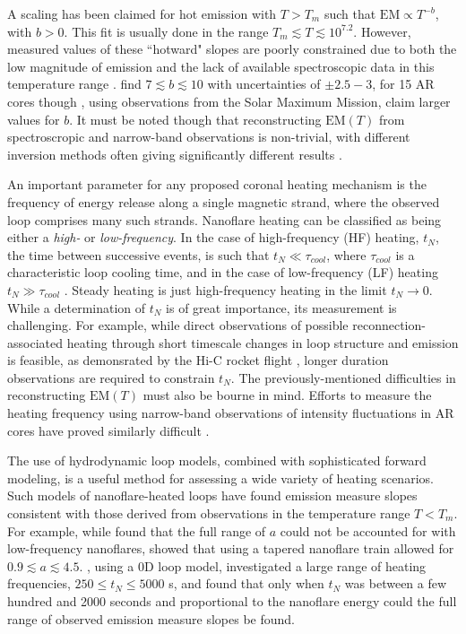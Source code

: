 \documentclass[preprint,linenumbers]{aastex}
\begin{document}
	\par A scaling has been claimed for hot emission with $T>T_m$ such that $\mathrm{EM}\propto T^{-b}$, with $b>0$. This fit is usually done in the range $T_m\lesssim T\lesssim10^{7.2}$. However, measured values of these ``hotward" slopes are poorly constrained due to both the low magnitude of emission and the lack of available spectroscopic data in this temperature range \citep{winebarger_defining_2012}. \citet{warren_systematic_2012} find $7\lesssim b\lesssim10$ with uncertainties of $\pm2.5-3$, for 15 AR cores though \citet{del_zanna_elemental_2014}, using observations from the Solar Maximum Mission, claim larger values for $b$. It must be noted though that reconstructing $\mathrm{EM}(T)$ from spectroscropic and narrow-band observations is non-trivial, with different inversion methods often giving significantly different results \citep{landi_monte_2012,guennou_can_2013}.
	\par An important parameter for any proposed coronal heating mechanism is the frequency of energy release along a single magnetic strand, where the observed loop comprises many such strands. Nanoflare heating can be classified as being either a \textit{high-} or \textit{low-frequency}. In the case of high-frequency (HF) heating, $t_N$, the time between successive events, is such that $t_N\ll\tau_{cool}$, where $\tau_{cool}$ is a characteristic loop cooling time, and in the case of low-frequency (LF) heating $t_N\gg\tau_{cool}$ \citep{mulu-moore_can_2011,warren_constraints_2011,bradshaw_diagnosing_2012,reep_diagnosing_2013,cargill_modelling_2015}. Steady heating is just high-frequency heating in the limit $t_N\to0$. While a determination of $t_N$ is of great importance, its measurement is challenging. For example, while direct observations of possible reconnection-associated heating through short timescale changes in loop structure and emission is feasible, as demonsrated by the Hi-C rocket flight \citep{cirtain_energy_2013,cargill_solar_2013}, longer duration observations are required to constrain $t_N$. The previously-mentioned difficulties in reconstructing $\mathrm{EM}(T)$ must also be bourne in mind. Efforts to measure the heating frequency using narrow-band observations of intensity fluctuations in AR cores  have proved similarly difficult \citep{ugarte-urra_determining_2014}.
	\par The use of hydrodynamic loop models, combined with sophisticated forward modeling, is a useful method for assessing a wide variety of heating scenarios. Such models of nanoflare-heated loops have found emission measure slopes consistent with those derived from observations in the temperature range $T<T_m$. For example, while \citet{bradshaw_diagnosing_2012} found that the full range of $a$ could not be accounted for with low-frequency nanoflares, \citet{reep_diagnosing_2013} showed that using a tapered nanoflare train allowed for $0.9\lesssim a\lesssim4.5$. \citet{cargill_active_2014}, using a 0D loop model, investigated a large range of heating frequencies, $250\le t_N\le5000$ s, and found that only when $t_N$ was between a few hundred and 2000 seconds and proportional to the nanoflare energy could the full range of observed emission measure slopes be found. 
\end{document}
